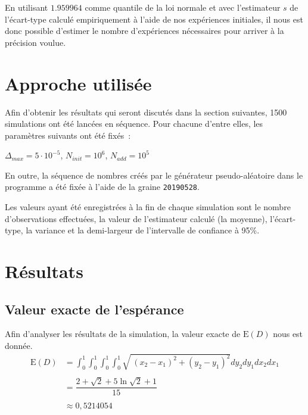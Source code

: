 \documentclass[paper=a4, fontsize=11pt]{scrartcl}
\begin{document}
En utilisant $1.959964$ comme quantile de la loi normale et avec l'estimateur $s$ de l'écart-type calculé empiriquement à l'aide de nos expériences initiales, il nous est donc possible d'estimer le nombre d'expériences nécessaires pour arriver à la précision voulue.

\section{Approche utilisée}

Afin d'obtenir les résultats qui seront discutés dans la section suivantes, 1500 simulations ont été lancées en séquence. Pour chacune d'entre elles, les paramètres suivants ont été fixés~:

$\Delta_{max} = 5\cdot 10^{-5}$,\hspace{20pt} $N_{init} = 10^6$,\hspace{20pt} $N_{add} = 10^5$

En outre, la séquence de nombres créés par le générateur pseudo-aléatoire dans le programme a été fixée à l'aide de la graine \texttt{20190528}.

Les valeurs ayant été enregistrées à la fin de chaque simulation sont le nombre d'observations effectuées, la valeur de l'estimateur calculé (la moyenne), l'écart-type, la variance et la demi-largeur de l'intervalle de confiance à 95\%.

\section{Résultats}

\subsection{Valeur exacte de l'espérance}

Afin d'analyser les résultats de la simulation, la valeur exacte de $\text{E}(D)$ nous est donnée.
\begin{align*}
  \text{E}(D) &= \int _0^1\int _0^1\int _0^1\int _0^1\sqrt{\:\left(x_2-x_1\right)^2+\left(y_2-y_1\right)^2}dy_2dy_1dx_2dx_1 \\ \\
  &= \dfrac{2 + \sqrt{2} + 5\ln{\sqrt{2} + 1}}{15} \\ \\
  &\approx 0,5214054
\end{align*}
\end{document}

